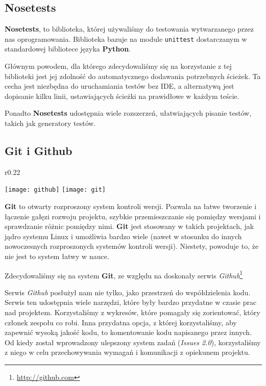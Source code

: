 \subsection{Nosetests}
\textbf{Nosetests}, to biblioteka, której używaliśmy do testowania wytwarzanego przez nas oprogramowania.
Biblioteka bazuje na module \texttt{unittest} dostarczanym w standardowej bibliotece języka \textbf{Python}.

Głównym powodem, dla którego zdecydowaliśmy się na korzystanie z tej biblioteki jest jej zdolność do automatycznego dodawania potrzebnych ścieżek.
Ta cecha jest niezbędna do uruchamiania testów bez IDE, a alternatywą jest dopisanie kilku linii, ustawiających ścieżki na prawidłowe w każdym teście.

Ponadto \textbf{Nosetests} udostępnia wiele rozszerzeń, ułatwiających pisanie testów, takich jak generatory testów.

\subsection{Git i Github}
\begin{wrapfigure}{r}{0.22\textwidth}
  \begin{center}
    \texttt{[image: github]}
    \texttt{[image: git]}
  \end{center}
\end{wrapfigure}
\textbf{Git} to otwarty rozproszony system kontroli wersji.
Pozwala na łatwe tworzenie i łączenie gałęzi rozwoju projektu, szybkie przemieszczanie się pomiędzy wersjami i sprawdzanie różnic pomiędzy nimi.
\textbf{Git} jest stosowany w takich projektach, jak jądro systemu Linux i umożliwia bardzo wiele (nawet w stosunku do innych nowoczesnych rozproszonych systemów kontroli wersji).
Niestety, powoduje to, że nie jest to system łatwy w nauce.

Zdecydowaliśmy się na system \textbf{Git}, ze względu na doskonały serwis \emph{Github}\footnote{\url{http://github.com}}

Serwis \emph{Github} posłużył nam nie tylko, jako przestrzeń do współdzielenia kodu.
Serwis ten udostępnia wiele narzędzi, które były bardzo przydatne w czasie prac nad projektem.
Korzystaliśmy z wykresów, które pomagały się zorientować, który członek zespołu co robi.
Inna przydatna opcja, z której korzystaliśmy, aby zapewnić wysoką jakość kodu, to komentowanie kodu napisanego przez innych.
Od kiedy został wprowadzony ulepszony system zadań (\emph{Issues 2.0}), korzystaliśmy z niego w celu przechowywania wymagań i komunikacji z opiekunem projektu.

